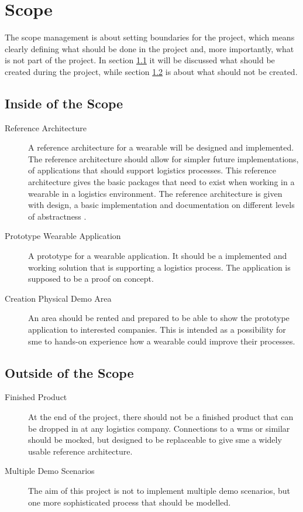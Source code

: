 \chapter{Scope}\label{cha:scope}
The scope management is about setting boundaries for the project, which means clearly defining what should be done in the project and, more importantly, what is not part of the project. In section \ref{sec:insideScope} it will be discussed what should be created during the project, while section \ref{sec:outsideScope} is about what should not be created.

\section{Inside of the Scope}\label{sec:insideScope}
\begin{description}
	\item[Reference Architecture] \hfill
	
	A reference architecture for a wearable will be designed and implemented. The reference architecture should allow for simpler future implementations, of applications that should support logistics processes. This reference architecture gives the basic packages that need to exist when working in a wearable in a logistics environment. The reference architecture is given with design, a basic implementation and documentation on different levels of abstractness \cite{Kruchten:1995}.
	\item[Prototype Wearable Application] \hfill
	
	A prototype for a wearable application. It should be a implemented and working solution that is supporting a logistics process. The application is supposed to be a proof on concept.
	\item[Creation Physical Demo Area] \hfill
	
	An area should be rented and prepared to be able to show the prototype application to interested companies. This is intended as a possibility for \gls{sme} to hands-on experience how a wearable could improve their processes.
\end{description}

\section{Outside of the Scope}\label{sec:outsideScope}
\begin{description}
	\item[Finished Product] \hfill
	
	At the end of the project, there should not be a finished product that can be dropped in at any logistics company. Connections to a \gls{wms} or similar should be mocked, but designed to be replaceable to give \gls{sme} a widely usable reference architecture.
	\item[Multiple Demo Scenarios] \hfill
	
	The aim of this project is not to implement multiple demo scenarios, but one more sophisticated process that should be modelled. 
\end{description}